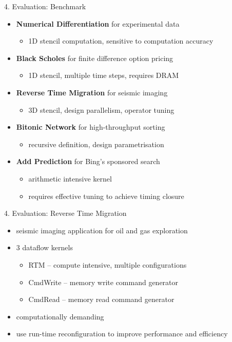 \begin{frame}{4. Evaluation: Benchmark}

  \begin{itemize}
  \setlength{\itemsep}{10pt}
  \item \textbf{Numerical Differentiation} for experimental data
    \begin{itemize}
    \item 1D stencil computation, sensitive to computation accuracy
    \end{itemize}
  \item \textbf{Black Scholes} for finite difference option pricing
    \begin{itemize}
    \item 1D stencil, multiple time steps, requires DRAM
    \end{itemize}
  \item \textbf{Reverse Time Migration} for seismic imaging
    \begin{itemize}
    \item 3D stencil, design parallelism, operator tuning
    \end{itemize}
  \item \textbf{Bitonic Network} for high-throughput sorting
    \begin{itemize}
    \item recursive definition, design parametrisation
    \end{itemize}
  \item \textbf{Add Prediction} for Bing's sponsored search
    \begin{itemize}
    \item arithmetic intensive kernel
    \item requires effective tuning to achieve timing closure
    \end{itemize}
  \end{itemize}
\end{frame}

\begin{frame}{4. Evaluation: Reverse Time Migration}
  \begin{itemize}
  \item seismic imaging application for oil and gas exploration
  \item 3 dataflow kernels
    \begin{itemize}
    \item RTM -- compute intensive, multiple configurations
    \item CmdWrite -- memory write command generator
    \item CmdRead -- memory read command generator
    \end{itemize}
  \item computationally demanding
  \item use run-time reconfiguration to improve performance and efficiency
  \end{itemize}
\end{frame}


